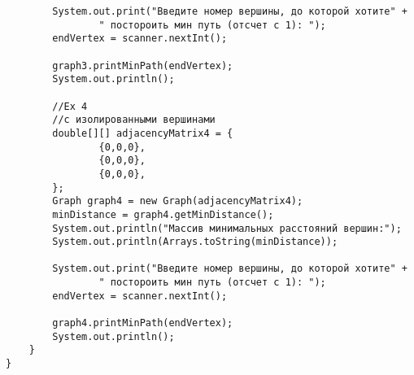 \begin{verbatim}
        System.out.print("Введите номер вершины, до которой хотите" +
                " постороить мин путь (отсчет с 1): ");
        endVertex = scanner.nextInt();

        graph3.printMinPath(endVertex);
        System.out.println();

        //Ex 4
        //с изолированными вершинами
        double[][] adjacencyMatrix4 = {
                {0,0,0},
                {0,0,0},
                {0,0,0},
        };
        Graph graph4 = new Graph(adjacencyMatrix4);
        minDistance = graph4.getMinDistance();
        System.out.println("Массив минимальных расстояний вершин:");
        System.out.println(Arrays.toString(minDistance));

        System.out.print("Введите номер вершины, до которой хотите" +
                " постороить мин путь (отсчет с 1): ");
        endVertex = scanner.nextInt();

        graph4.printMinPath(endVertex);
        System.out.println();
    }
}
\end{verbatim}
